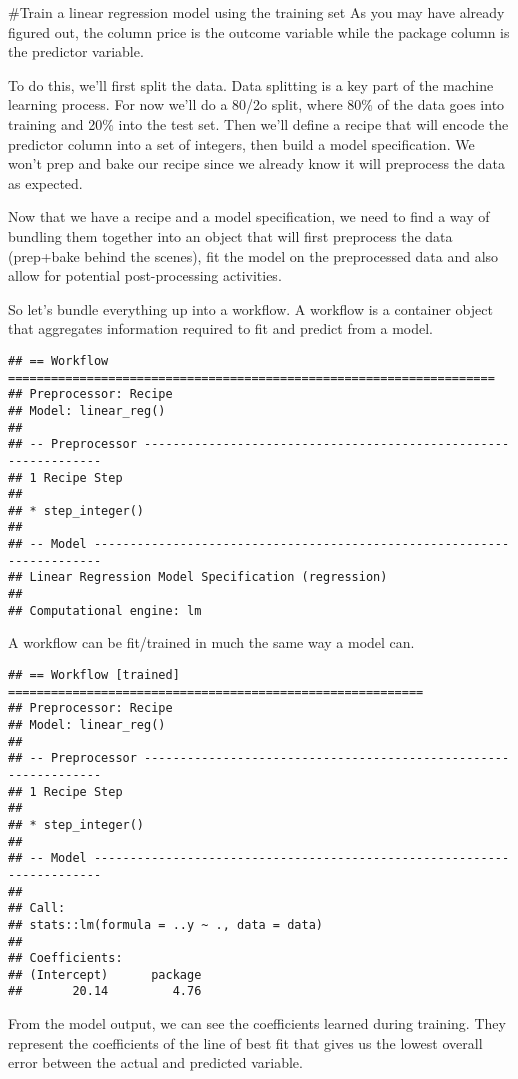 \documentclass[
]{article}
\begin{document}
\#Train a linear regression model using the training set As you may have
already figured out, the column price is the outcome variable while the
package column is the predictor variable.

To do this, we'll first split the data. Data splitting is a key part of
the machine learning process. For now we'll do a 80/2o split, where 80\%
of the data goes into training and 20\% into the test set. Then we'll
define a recipe that will encode the predictor column into a set of
integers, then build a model specification. We won't prep and bake our
recipe since we already know it will preprocess the data as expected.

Now that we have a recipe and a model specification, we need to find a
way of bundling them together into an object that will first preprocess
the data (prep+bake behind the scenes), fit the model on the
preprocessed data and also allow for potential post-processing
activities.

So let's bundle everything up into a workflow. A workflow is a container
object that aggregates information required to fit and predict from a
model.

\begin{verbatim}
## == Workflow ====================================================================
## Preprocessor: Recipe
## Model: linear_reg()
## 
## -- Preprocessor ----------------------------------------------------------------
## 1 Recipe Step
## 
## * step_integer()
## 
## -- Model -----------------------------------------------------------------------
## Linear Regression Model Specification (regression)
## 
## Computational engine: lm
\end{verbatim}

A workflow can be fit/trained in much the same way a model can.

\begin{verbatim}
## == Workflow [trained] ==========================================================
## Preprocessor: Recipe
## Model: linear_reg()
## 
## -- Preprocessor ----------------------------------------------------------------
## 1 Recipe Step
## 
## * step_integer()
## 
## -- Model -----------------------------------------------------------------------
## 
## Call:
## stats::lm(formula = ..y ~ ., data = data)
## 
## Coefficients:
## (Intercept)      package  
##       20.14         4.76
\end{verbatim}

From the model output, we can see the coefficients learned during
training. They represent the coefficients of the line of best fit that
gives us the lowest overall error between the actual and predicted
variable.
\end{document}
